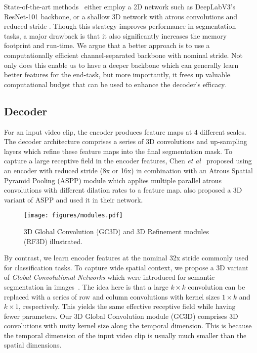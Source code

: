 \documentclass{bmvc2k}
\makeatletter
\newcommand*{\etal}{\emph{et al.}\@\xspace}
\def\etal{\emph{et al}\bmvaOneDot}
\makeatother
\begin{document}
State-of-the-art methods~\cite{Yang19ICCVAnchorDiff,Wang19ICCV} either employ a 2D network such as DeepLabV3's~\cite{Chen17ARXIV} ResNet-101 backbone, or a shallow 3D network with atrous convolutions and reduced stride \cite{Hou19BMVC}. Though this strategy improves performance in segmentation tasks, a major drawback is that it also significantly increases the memory footprint and run-time. We argue that a better approach is to use a computationally efficient channel-separated backbone with nominal stride. Not only does this enable us to have a deeper backbone which can generally learn better features for the end-task, but more importantly, it frees up valuable computational budget that can be used to enhance the decoder's efficacy.



\subsection{Decoder}
\label{sec:decoder}

For an input video clip, the encoder produces feature maps at 4 different scales. The decoder architecture comprises a series of 3D convolutions and up-sampling layers which refine these feature maps into the final segmentation mask. 
To capture a large receptive field in the encoder features, Chen \etal~\cite{Chen2018ECCV} proposed using an encoder with reduced stride (8x or 16x) in combination with an Atrous Spatial Pyramid Pooling (ASPP) module which applies multiple parallel atrous convolutions with different dilation rates to a feature map. \cite{Hou19BMVC} also proposed a 3D variant of ASPP and used it in their network. 

\begin{wrapfigure}[18]{r}{0.5\textwidth}
\centering
    \texttt{[image: figures/modules.pdf]}
    \caption{3D Global Convolution (GC3D) and 3D Refinement modules (RF3D) illustrated.}
    \label{fig:modules}
\vspace{-3mm}
\end{wrapfigure}
By contrast, we learn encoder features at the nominal 32x stride commonly used for classification tasks.
To capture wide spatial context, we propose a 3D variant of \textit{Global Convolutional Networks} which were introduced for semantic segmentation in images~\cite{Peng17CVPR}.
The idea here is that a large $k\times k$ convolution can be replaced with a series of row and column convolutions with kernel sizes $1\times k$ and $k\times 1$, respectively. This yields the same effective receptive field while having fewer parameters. 
Our 3D Global Convolution module (GC3D) comprises 3D convolutions with unity kernel size along the temporal dimension. This is because the temporal dimension of the input video clip is usually much smaller than the spatial dimensions.
\end{document}
